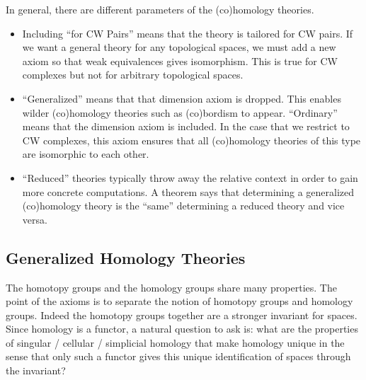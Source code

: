 \documentclass[a4paper]{article}
\begin{document}
In general, there are different parameters of the (co)homology theories. 
\begin{itemize}
\item Including ``for CW Pairs'' means that the theory is tailored for CW pairs. If we want a general theory for any topological spaces, we must add a new axiom so that weak equivalences gives isomorphism. This is true for CW complexes but not for arbitrary topological spaces. 
\item ``Generalized'' means that that dimension axiom is dropped. This enables wilder (co)homology theories such as (co)bordism to appear. ``Ordinary'' means that the dimension axiom is included. In the case that we restrict to CW complexes, this axiom ensures that all (co)homology theories of this type are isomorphic to each other. 
\item ``Reduced'' theories typically throw away the relative context in order to gain more concrete computations. A theorem says that determining a generalized (co)homology theory is the ``same'' determining a reduced theory and vice versa. 
\end{itemize}

\subsection{Generalized Homology Theories}
The homotopy groups and the homology groups share many properties. The point of the axioms is to separate the notion of homotopy groups and homology groups. Indeed the homotopy groups together are a stronger invariant for spaces. Since homology is a functor, a natural question to ask is: what are the properties of singular / cellular / simplicial homology that make homology unique in the sense that only such a functor gives this unique identification of spaces through the invariant? 
\end{document}
